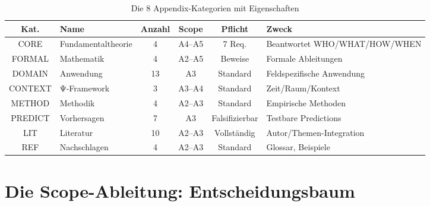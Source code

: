 \documentclass[12pt,a4paper]{article}
\begin{document}
\begin{table}[htbp]
\centering
\caption{Die 8 Appendix-Kategorien mit Eigenschaften}
\renewcommand{\arraystretch}{1.4}
\small
\begin{tabular}{@{}clcccp{4cm}@{}}
\toprule
\textbf{Kat.} & \textbf{Name} & \textbf{Anzahl} & \textbf{Scope} & \textbf{Pflicht} & \textbf{Zweck} \\
\midrule
CORE & Fundamentaltheorie & 4 & A4--A5 & 7 Req. & Beantwortet WHO/WHAT/HOW/WHEN \\
FORMAL & Mathematik & 4 & A2--A5 & Beweise & Formale Ableitungen \\
DOMAIN & Anwendung & 13 & A3 & Standard & Feldspezifische Anwendung \\
CONTEXT & Ψ-Framework & 3 & A3--A4 & Standard & Zeit/Raum/Kontext \\
METHOD & Methodik & 4 & A2--A3 & Standard & Empirische Methoden \\
PREDICT & Vorhersagen & 7 & A3 & Falsifizierbar & Testbare Predictions \\
LIT & Literatur & 10 & A2--A3 & Vollständig & Autor/Themen-Integration \\
REF & Nachschlagen & 4 & A2--A3 & Standard & Glossar, Beispiele \\
\bottomrule
\end{tabular}
\end{table}

\section{Die Scope-Ableitung: Entscheidungsbaum}
\end{document}
